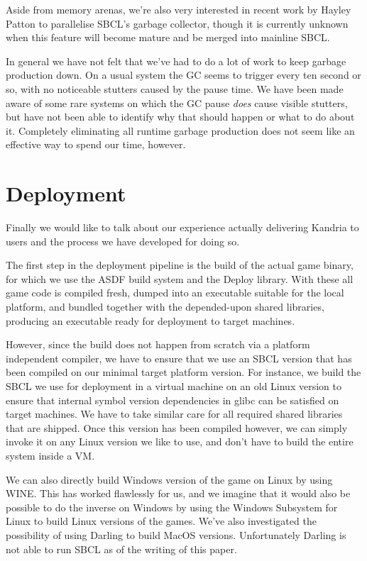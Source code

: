 \documentclass[format=sigconf]{acmart}
\begin{document}
Aside from memory arenas, we're also very interested in recent work by Hayley Patton to parallelise SBCL's garbage collector, though it is currently unknown when this feature will become mature and be merged into mainline SBCL.

In general we have not felt that we've had to do a lot of work to keep garbage production down. On a usual system the GC seems to trigger every ten second or so, with no noticeable stutters caused by the pause time. We have been made aware of some rare systems on which the GC pause \textit{does} cause visible stutters, but have not been able to identify why that should happen or what to do about it. Completely eliminating all runtime garbage production does not seem like an effective way to spend our time, however.

\section{Deployment}\label{deployment}
Finally we would like to talk about our experience actually delivering Kandria to users and the process we have developed for doing so.

The first step in the deployment pipeline is the build of the actual game binary, for which we use the ASDF build system and the Deploy library. With these all game code is compiled fresh, dumped into an executable suitable for the local platform, and bundled together with the depended-upon shared libraries, producing an executable ready for deployment to target machines.

However, since the build does not happen from scratch via a platform independent compiler, we have to ensure that we use an SBCL version that has been compiled on our minimal target platform version. For instance, we build the SBCL we use for deployment in a virtual machine on an old Linux version to ensure that internal symbol version dependencies in glibc can be satisfied on target machines. We have to take similar care for all required shared libraries that are shipped. Once this version has been compiled however, we can simply invoke it on any Linux version we like to use, and don't have to build the entire system inside a VM.

We can also directly build Windows version of the game on Linux by using WINE. This has worked flawlessly for us, and we imagine that it would also be possible to do the inverse on Windows by using the Windows Subsystem for Linux to build Linux versions of the games. We've also investigated the possibility of using Darling to build MacOS versions. Unfortunately Darling is not able to run SBCL as of the writing of this paper.
\end{document}
